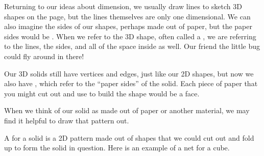 \documentclass{ximera}
\begin{document}
Returning to our ideas about dimension, we usually draw lines to sketch 3D shapes on the page, but the lines themselves are only one dimensional. We can also imagine the sides of our shapes, perhaps made out of paper, but the paper sides would be . When we refer to the 3D shape, often called a , we are referring to the lines, the sides, and all of the space inside as well. Our friend the little bug could fly around in there!

Our 3D solids still have vertices and edges, just like our 2D shapes, but now we also have , which refer to the ``paper sides'' of the solid. Each piece of paper that you might cut out and use to build the shape would be a face.

When we think of our solid as made out of paper or another material, we may find it helpful to draw that pattern out.
\begin{definition}
A  for a solid is a 2D pattern made out of shapes that we could cut out and fold up to form the solid in question. Here is an example of a net for a cube.
\begin{image}
\end{image}
\end{definition}
\end{document}

